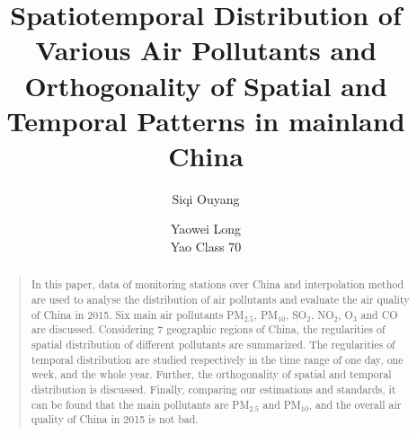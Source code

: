 \documentclass[letterpaper]{article}
\begin{document}
% 
\title{Spatiotemporal Distribution of Various Air Pollutants and Orthogonality of Spatial and Temporal Patterns in mainland China}
\author{Siqi Ouyang \and Yaowei Long \\ Yao Class 70}
\maketitle
\begin{abstract}
  \begin{quote}
    In this paper, data of monitoring stations over China and interpolation method are used to analyse the distribution of air pollutants and evaluate the air quality of China in 2015. Six main air pollutants PM$_{2.5}$, PM$_{10}$, SO$_{2}$, NO$_{2}$, O$_{3}$ and CO are discussed. Considering 7 geographic regions of China, the regularities of spatial distribution of different pollutants are summarized. The regularities of temporal distribution are studied respectively in the time range of one day, one week, and the whole year. Further, the orthogonality of spatial and temporal distribution is discussed. Finally, comparing our estimations and standards, it can be found that the main pollutants are PM$_{2.5}$ and PM$_{10}$, and the overall air quality of China in 2015 is not bad.
  \end{quote}
\end{abstract}
\end{document}

